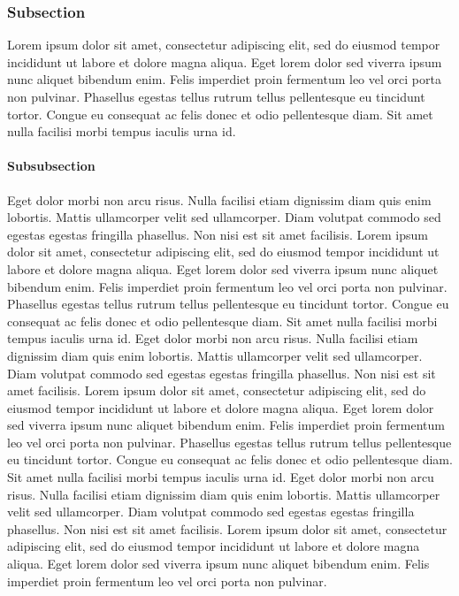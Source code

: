 \documentclass[
]{article}
\begin{document}
\subsubsection{Subsection}\label{subsection}

Lorem ipsum dolor sit amet, consectetur adipiscing elit, sed do eiusmod
tempor incididunt ut labore et dolore magna aliqua. Eget lorem dolor sed
viverra ipsum nunc aliquet bibendum enim. Felis imperdiet proin
fermentum leo vel orci porta non pulvinar. Phasellus egestas tellus
rutrum tellus pellentesque eu tincidunt tortor. Congue eu consequat ac
felis donec et odio pellentesque diam. Sit amet nulla facilisi morbi
tempus iaculis urna id.

\paragraph{Subsubsection}\label{subsubsection}

Eget dolor morbi non arcu risus. Nulla facilisi etiam dignissim diam
quis enim lobortis. Mattis ullamcorper velit sed ullamcorper. Diam
volutpat commodo sed egestas egestas fringilla phasellus. Non nisi est
sit amet facilisis. Lorem ipsum dolor sit amet, consectetur adipiscing
elit, sed do eiusmod tempor incididunt ut labore et dolore magna aliqua.
Eget lorem dolor sed viverra ipsum nunc aliquet bibendum enim. Felis
imperdiet proin fermentum leo vel orci porta non pulvinar. Phasellus
egestas tellus rutrum tellus pellentesque eu tincidunt tortor. Congue eu
consequat ac felis donec et odio pellentesque diam. Sit amet nulla
facilisi morbi tempus iaculis urna id. Eget dolor morbi non arcu risus.
Nulla facilisi etiam dignissim diam quis enim lobortis. Mattis
ullamcorper velit sed ullamcorper. Diam volutpat commodo sed egestas
egestas fringilla phasellus. Non nisi est sit amet facilisis. Lorem
ipsum dolor sit amet, consectetur adipiscing elit, sed do eiusmod tempor
incididunt ut labore et dolore magna aliqua. Eget lorem dolor sed
viverra ipsum nunc aliquet bibendum enim. Felis imperdiet proin
fermentum leo vel orci porta non pulvinar. Phasellus egestas tellus
rutrum tellus pellentesque eu tincidunt tortor. Congue eu consequat ac
felis donec et odio pellentesque diam. Sit amet nulla facilisi morbi
tempus iaculis urna id. Eget dolor morbi non arcu risus. Nulla facilisi
etiam dignissim diam quis enim lobortis. Mattis ullamcorper velit sed
ullamcorper. Diam volutpat commodo sed egestas egestas fringilla
phasellus. Non nisi est sit amet facilisis. Lorem ipsum dolor sit amet,
consectetur adipiscing elit, sed do eiusmod tempor incididunt ut labore
et dolore magna aliqua. Eget lorem dolor sed viverra ipsum nunc aliquet
bibendum enim. Felis imperdiet proin fermentum leo vel orci porta non
pulvinar.
\end{document}
